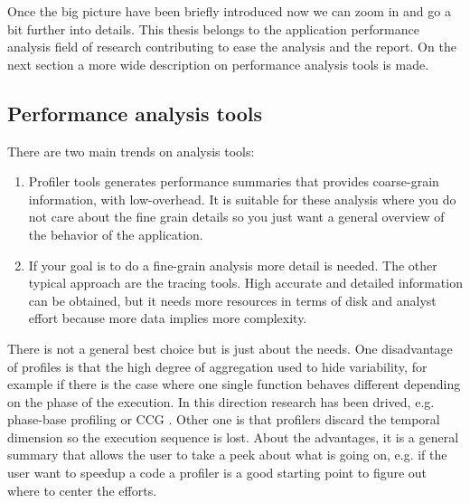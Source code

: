 Once the big picture have been briefly introduced now we can zoom in and go a
bit further into details. This thesis belongs to the application performance 
analysis field of research contributing to ease the analysis and the report. 
On the next section a more wide description on performance analysis tools is made.

\subsection{Performance analysis tools}

There are two main trends on analysis tools:
\begin{enumerate}[label=\roman*)]
    \item Profiler tools 
      generates performance summaries that provides coarse-grain information, 
      with low-overhead. It is suitable for these analysis where you do not care
      about the fine grain details so you just want a general overview of the
      behavior of the application.
    \item If your goal is to do a fine-grain analysis more detail is needed. The 
      other typical approach are the tracing tools. High accurate and detailed 
      information can be obtained, but it needs more resources in terms of disk 
      and analyst effort because more data implies more complexity.
\end{enumerate}
There is not a general best choice but is just about the needs. One
disadvantage of profiles is that the high degree of aggregation used to hide
variability, for example if there is the case where one single function
behaves different depending on the phase of the execution. In this direction
research has been drived, e.g. phase-base profiling \cite{malony2005phase} or
CCG \cite{knupfer2005construction}. Other one is
that profilers discard the temporal dimension so the execution sequence is lost.
About the advantages, it is a general summary that allows the user to take a
peek about what is going on, e.g. if the user want to speedup a code a profiler
is a good starting point to figure out where to center the efforts. 

